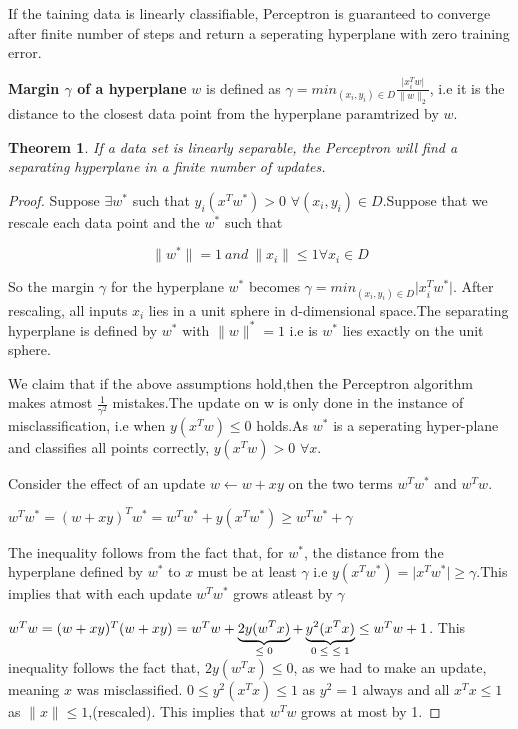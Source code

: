 \documentclass[12pt]{article}
\newtheorem*{thm}{Theorem}
\begin{document}
 \cleardoublepage

 If the taining data is linearly classifiable, Perceptron is guaranteed to converge after finite number of steps and return a seperating hyperplane with zero training error.
 

 
 \textbf{Margin $\gamma$ of a hyperplane} $w$ is defined as $\gamma = min_{(x_{i},y_{i})\in D}  \frac{ \vert x_{i}^{T}w \vert}{\|w\|_{2}}$, i.e it is the distance to the closest data point from the hyperplane paramtrized by $w$.
 
 \begin{thm}If a data set is linearly separable, the Perceptron will find a separating hyperplane in a finite number of updates.\end{thm}
 
 \begin{proof}
 	Suppose $\exists w^{*}$ such that $ y_{i}(x^{T}w^{*}) > 0$ $ \forall (x_{i},y_{i}) \in D$.Suppose that we rescale each data point and the $w^{*}$ such that
 	
 	
 	$$\|w^{*}\| = 1 \ and \ \|x_{i}\| \leq 1 \forall x_{i} \in D $$
 	
    So the margin $\gamma$ for the hyperplane $w^{*}$ becomes $ \gamma = min_{(x_{i},y_{i})\in D} \vert x_{i}^{T}w^{*} \vert $. After rescaling, all inputs   $x_{i}$ lies in a unit sphere in d-dimensional space.The separating hyperplane is defined  by $w^{*}$ with $\|w\|^{*} = 1$ i.e is \textbf{$w^{*}$} lies exactly on the unit sphere.
    
    We claim that if the above assumptions hold,then the Perceptron algorithm makes atmost $\frac{1}{\gamma ^{2}}$ mistakes.The update on w is only done in the instance of misclassification, i.e when  $y(x^{T}w) \leq 0$ holds.As $w^{*}$ is a seperating hyper-plane and classifies all points correctly,  $y(x^{T}w)>0$ $ \forall x$.
    
     Consider the effect of an update $w \leftarrow w + xy $ on the two terms $w^{T}w^{*}$ and $w^{T}w$.
     
     $w^{T}w^{*} = (w+xy)^{T}w^{*} = w^{T}w^{*} + y(x^{T}w^{*}) \geq w^{T}w^{*} + \gamma $
        
    The inequality follows from the fact that, for $w^{*}$, the distance from the hyperplane defined by $w^{*}$ to $x$ must be at least $\gamma$ i.e
    $y(x^{T}w^{*}) = \vert x^{T}w^{*}\vert \geq \gamma$.This implies that with each update $w^{T}w^{*}$ grows atleast by $\gamma$
 
     $w^{T}w = (w+xy)^{T}(w+xy) = w^{T}w + \underbrace{2y(w^{T}x)}_\text{$ \leq 0$} + \underbrace{y^{2}(x^{T}x)}_\text{$0 \leq \ \leq 1$}  \leq
     w^{T}w + 1$.
     This inequality follows the fact that, $2y(w^{T}x) \leq 0$,  as we had to make an update, meaning $x$ was misclassified. $0 \leq y^{2}(x^{T}x) \leq 1$ as $y^{2}=1 $ always and all $x^{T}x \leq 1$ as $\|x\| \leq 1$,(rescaled). This implies that $w^{T}w$ grows at most by 1.
     

\end{proof}
\end{document}
